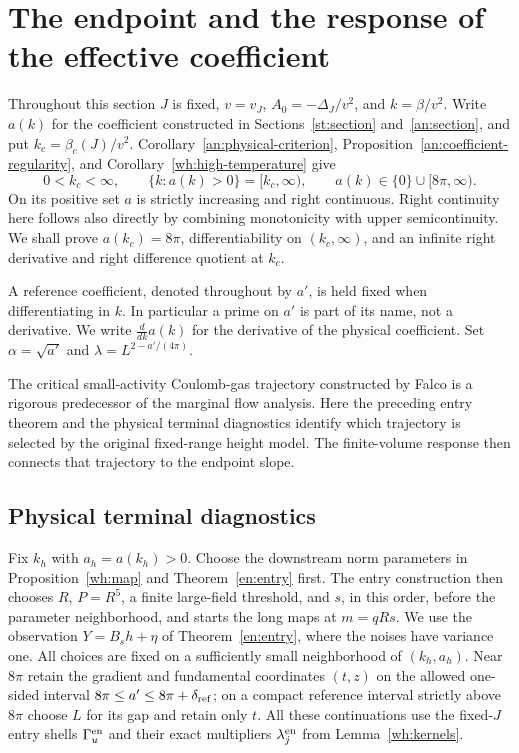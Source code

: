 \section{The endpoint and the response of the effective coefficient}
\label{ep:section}

Throughout this section $J$ is fixed, $v=v_J$, $A_0=-\Delta_J/v^2$,
and $k=\beta/v^2$.  Write $a(k)$ for the coefficient constructed in
Sections~\ref{st:section} and~\ref{an:section}, and put
$k_c=\beta_c(J)/v^2$.  Corollary~\ref{an:physical-criterion},
Proposition~\ref{an:coefficient-regularity}, and
Corollary~\ref{wh:high-temperature} give
\[
 0<k_c<\infty,\qquad
 \{k:a(k)>0\}=[k_c,\infty),\qquad
 a(k)\in\{0\}\cup[8\pi,\infty).
\]
On its positive set $a$ is strictly increasing and right continuous.
Right continuity here follows also directly by combining monotonicity
with upper semicontinuity.  We shall prove $a(k_c)=8\pi$,
differentiability on $(k_c,\infty)$, and an infinite right derivative
and right difference quotient at $k_c$.

A reference coefficient, denoted throughout by $a'$, is held fixed
when differentiating in $k$.  In particular a prime on $a'$ is part
of its name, not a derivative.  We write $\frac{d}{dk}a(k)$ for the
derivative of the physical coefficient.  Set $\alpha=\sqrt{a'}$ and
$\lambda=L^{2-a'/(4\pi)}$.

The critical small-activity Coulomb-gas trajectory constructed by
Falco \citep{Falco2012} is a rigorous predecessor of the marginal
flow analysis.  Here the preceding entry theorem and the physical
terminal diagnostics identify which trajectory is selected by the
original fixed-range height model.  The finite-volume response then
connects that trajectory to the endpoint slope.

\subsection{Physical terminal diagnostics}

Fix $k_h$ with $a_h=a(k_h)>0$.  Choose the downstream norm parameters
in Proposition~\ref{wh:map} and Theorem~\ref{en:entry} first.  The entry
construction then chooses $R$, $P=R^5$, a finite large-field threshold,
and $s$, in this order, before the parameter neighborhood, and starts
the long maps at $m=qRs$.  We use the observation
$Y=B_s h+\eta$ of Theorem~\ref{en:entry}, where the noises have
variance one.  All choices are fixed on a sufficiently small
neighborhood of $(k_h,a_h)$.  Near $8\pi$ retain the gradient and
fundamental coordinates $(t,z)$ on the allowed one-sided interval
$8\pi\le a'\le8\pi+\delta_{\rm ref}$; on a compact reference interval
strictly above $8\pi$ choose $L$ for its gap and retain only $t$.
All these continuations use the fixed-$J$ entry shells
$\Gamma_u^{\rm en}$ and their exact multipliers
$\lambda_j^{\rm en}$ from Lemma~\ref{wh:kernels}.

